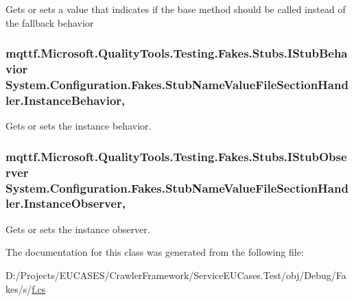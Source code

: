 Gets or sets a value that indicates if the base method should be called instead of the fallback behavior

\hypertarget{class_system_1_1_configuration_1_1_fakes_1_1_stub_name_value_file_section_handler_a8a1841e4191571aead985f42d6ae9ff7}{
\subsubsection[{Instance\-Behavior}]{\setlength{\rightskip}{0pt plus 5cm}mqttf.\-Microsoft.\-Quality\-Tools.\-Testing.\-Fakes.\-Stubs.\-I\-Stub\-Behavior System.\-Configuration.\-Fakes.\-Stub\-Name\-Value\-File\-Section\-Handler.\-Instance\-Behavior\hspace{0.3cm}{\ttfamily [get]}, {\ttfamily [set]}}}\label{class_system_1_1_configuration_1_1_fakes_1_1_stub_name_value_file_section_handler_a8a1841e4191571aead985f42d6ae9ff7}


Gets or sets the instance behavior.

\hypertarget{class_system_1_1_configuration_1_1_fakes_1_1_stub_name_value_file_section_handler_a1e7fd381940f1f1678713d013154929f}{
\subsubsection[{Instance\-Observer}]{\setlength{\rightskip}{0pt plus 5cm}mqttf.\-Microsoft.\-Quality\-Tools.\-Testing.\-Fakes.\-Stubs.\-I\-Stub\-Observer System.\-Configuration.\-Fakes.\-Stub\-Name\-Value\-File\-Section\-Handler.\-Instance\-Observer\hspace{0.3cm}{\ttfamily [get]}, {\ttfamily [set]}}}\label{class_system_1_1_configuration_1_1_fakes_1_1_stub_name_value_file_section_handler_a1e7fd381940f1f1678713d013154929f}


Gets or sets the instance observer.



The documentation for this class was generated from the following file\-:\begin{DoxyCompactItemize}
\item 
D\-:/\-Projects/\-E\-U\-C\-A\-S\-E\-S/\-Crawler\-Framework/\-Service\-E\-U\-Cases.\-Test/obj/\-Debug/\-Fakes/s/\hyperlink{s_2f_8cs}{f.\-cs}\end{DoxyCompactItemize}
